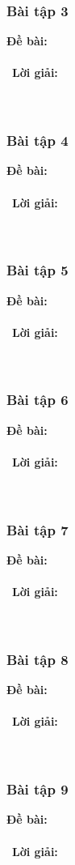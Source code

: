 \documentclass[a4paper]{article}
\begin{document}
\subsubsection{Bài tập 3}
\textbf{Đề bài:} 
\\\ \\\
\textbf{Lời giải:} \\\ \\\
\clearpage
\subsubsection{Bài tập 4}
\textbf{Đề bài:} 
\\\ \\\
\textbf{Lời giải:} \\\ \\\
\clearpage
\subsubsection{Bài tập 5}
\textbf{Đề bài:} 
\\\ \\\
\textbf{Lời giải:} \\\ \\\
\clearpage
\subsubsection{Bài tập 6}
\textbf{Đề bài:} 
\\\ \\\
\textbf{Lời giải:} \\\ \\\
\clearpage
\subsubsection{Bài tập 7}
\textbf{Đề bài:} 
\\\ \\\
\textbf{Lời giải:} \\\ \\\
\clearpage
\subsubsection{Bài tập 8}
\textbf{Đề bài:} 
\\\ \\\
\textbf{Lời giải:} \\\ \\\
\clearpage
\subsubsection{Bài tập 9}
\textbf{Đề bài:} 
\\\ \\\
\textbf{Lời giải:} \\\ \\\
\clearpage
\end{document}
